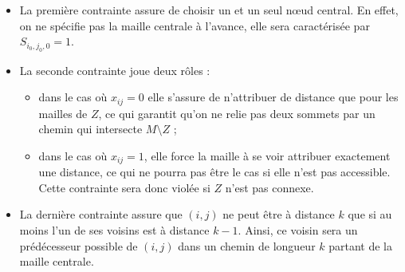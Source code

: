 \documentclass[a4paper,11pt] {article}
\begin{document}

\begin{itemize}
\item La première contrainte assure de choisir un et un seul nœud central. En effet, on ne spécifie pas la maille centrale à l'avance, elle sera caractérisée par $S_{i_0, j_0, 0} = 1$.
\item La seconde contrainte joue deux rôles :
  \begin{itemize}
  \item dans le cas où $x_{ij}=0$ elle s'assure de n'attribuer de
    distance que pour les mailles de $Z$, ce qui garantit qu'on ne
    relie pas deux sommets par un chemin qui intersecte
    $M \setminus Z$ ;
  \item dans le cas où $x_{ij}=1$, elle force la maille à se voir
    attribuer exactement une distance, ce qui ne pourra pas être le
    cas si elle n'est pas accessible. Cette contrainte sera donc
    violée si $Z$ n'est pas connexe.
  \end{itemize}
\item La dernière contrainte assure que $(i,j)$ ne peut être à distance $k$ que si au moins l'un de ses voisins est à distance $k-1$. Ainsi, ce voisin sera un prédécesseur possible de $(i,j)$ dans un chemin de longueur $k$ partant de la maille centrale.
\end{itemize}


	
\end{document}
